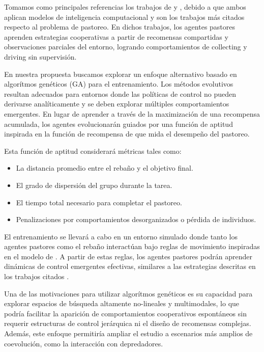 \documentclass[final]{article}
\begin{document}
Tomamos como principales referencias los trabajos de \citet{NapolitanoShepherding} y \citet{CovoneShepherding}, debido a que ambos aplican modelos de inteligencia computacional y son los trabajos más citados respecto al problema de pastoreo. En dichos trabajos, los agentes pastores aprenden estrategias cooperativas a partir de recomensas compartidas y observaciones parciales del entorno, logrando comportamientos de collecting y driving \citep{Strombom} sin supervisión.

En nuestra propuesta buscamos explorar un enfoque alternativo basado en algorítmos genéticos (GA) para el entrenamiento. Los métodos evolutivos resultan adecuados para entornos donde las políticas de control no pueden derivarse analíticamente y se deben explorar múltiples comportamientos emergentes. En lugar de aprender a través de la maximización de una recompensa acumulada, los agentes evolucionarán guiados por una función de aptitud inspirada en la función de recompensa de \citet{NapolitanoShepherding} que mida el desempeño del pastoreo.

Esta función de aptitud considerará métricas tales como:
\begin{itemize}
    \item La distancia promedio entre el rebaño y el objetivo final.
    \item El grado de dispersión del grupo durante la tarea.
    \item El tiempo total necesario para completar el pastoreo.
    \item Penalizaciones por comportamientos desorganizados o pérdida de individuos.
\end{itemize}

El entrenamiento se llevará a cabo en un entorno simulado donde tanto los agentes pastores como el rebaño interactúan bajo reglas de movimiento inspiradas en el modelo de \citet{Strombom}. A partir de estas reglas, los agentes pastores podrán aprender dinámicas de control emergentes efectivas, similares a las estrategias descritas en los trabajos citados \citep{Strombom} \citep{NapolitanoShepherding} \citep{CovoneShepherding}.

Una de las motivaciones para utilizar algorítmos genéticos es su capacidad para explorar espacios de búsqueda altamente no-lineales y multimodales, lo que podría facilitar la aparición de comportamientos cooperativos espontáneos sin requerir estructuras de control jerárquica ni el diseño de recomensas complejas. Además, este enfoque permitiría ampliar el estudio a escenarios más amplios de coevolución, como la interacción con depredadores.
\end{document}

